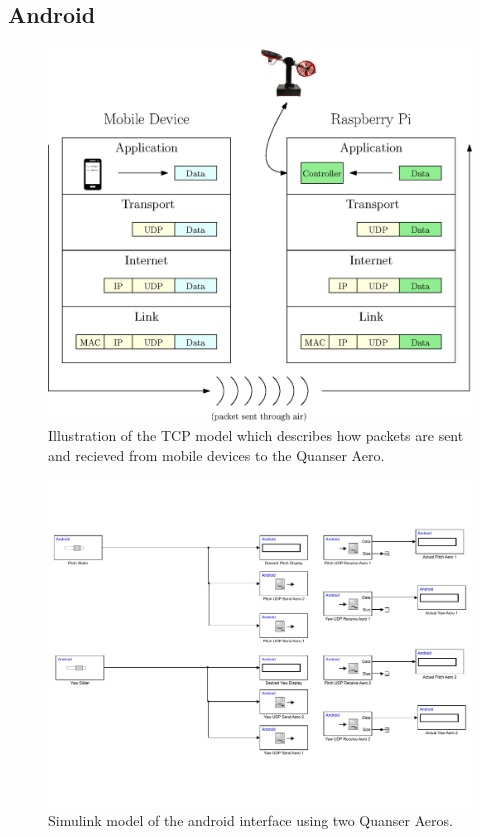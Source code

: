 \subsection{Android}
\begin{figure}[!htbp]
    \centering
    \includegraphics[width=.46\textwidth,keepaspectratio=true]{figs/ipe/TCPModel.eps}
    \caption{Illustration of the TCP model which describes how packets are sent and recieved from mobile devices to the Quanser Aero.}
    \label{fig:TCPModel}
\end{figure}

\begin{figure}[!htbp]
    \centering
    \includegraphics[width=.46\textwidth,keepaspectratio=true]{figs/img/Android_Interface_2Aero}
    \caption{Simulink model of the android interface using two Quanser Aeros.}
    \label{fig:Android_Interface}
\end{figure}

